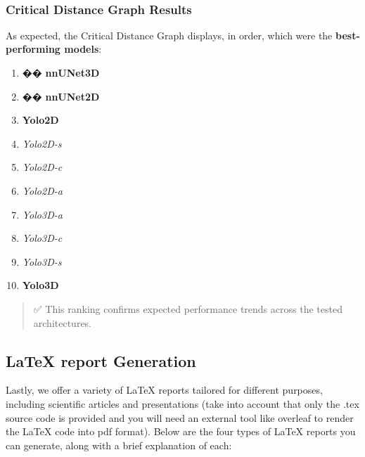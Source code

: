 \documentclass[11pt]{article}
\providecommand{\tightlist}{%
      \setlength{\itemsep}{0pt}\setlength{\parskip}{0pt}}
\begin{document}
    \begin{center}
    \end{center}
    { \hspace*{\fill} \\}
    
    \subsubsection{Critical Distance Graph
Results}\label{critical-distance-graph-results}

As expected, the Critical Distance Graph displays, in order, which were
the \textbf{best-performing models}:

\begin{enumerate}
\def\labelenumi{\arabic{enumi}.}
\tightlist
\item
  �� \textbf{nnUNet3D}
\item
  �� \textbf{nnUNet2D}
\item
  \textbf{Yolo2D}
\item
  \emph{Yolo2D-s}
\item
  \emph{Yolo2D-c}
\item
  \emph{Yolo2D-a}
\item
  \emph{Yolo3D-a}
\item
  \emph{Yolo3D-c}
\item
  \emph{Yolo3D-s}
\item
  \textbf{Yolo3D}
\end{enumerate}

\begin{quote}
✅ This ranking confirms expected performance trends across the tested
architectures.
\end{quote}

    \subsection{LaTeX report Generation}\label{latex-report-generation}

    Lastly, we offer a variety of LaTeX reports tailored for different
purposes, including scientific articles and presentations (take into
account that only the .tex source code is provided and you will need an
external tool like overleaf to render the LaTeX code into pdf format).
Below are the four types of LaTeX reports you can generate, along with a
brief explanation of each:
\end{document}
